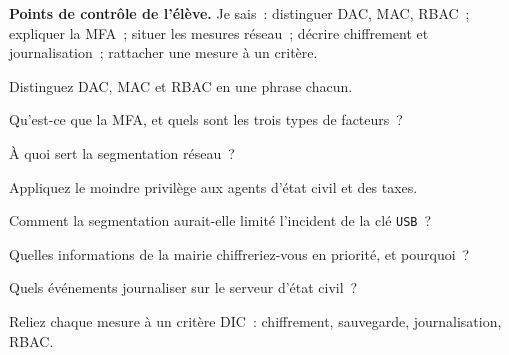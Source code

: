 \begin{boxinfo}
\textbf{Points de contrôle de l'élève.} Je sais~: distinguer DAC, MAC, RBAC~;
expliquer la MFA~; situer les mesures réseau~; décrire chiffrement et
journalisation~; rattacher une mesure à un critère.
\end{boxinfo}

\bigskip

\begin{boxexo}[title={\ding{45}\quad Exercice~16.1. Les modèles \niveaubase}]
Distinguez DAC, MAC et RBAC en une phrase chacun.
\end{boxexo}

\begin{boxexo}[title={\ding{45}\quad Exercice~16.2. MFA \niveaubase}]
Qu'est-ce que la MFA, et quels sont les trois types de facteurs~?
\end{boxexo}

\begin{boxexo}[title={\ding{45}\quad Exercice~16.3. Rôle d'une mesure \niveaubase}]
À quoi sert la segmentation réseau~?
\end{boxexo}

\begin{boxexo}[title={\ding{45}\quad Exercice~16.4. Moindre privilège \niveaumoyen}]
Appliquez le moindre privilège aux agents d'état civil et des taxes.
\end{boxexo}

\begin{boxexo}[title={\ding{45}\quad Exercice~16.5. Segmentation \niveaumoyen}]
Comment la segmentation aurait-elle limité l'incident de la clé \texttt{USB}~?
\end{boxexo}

\begin{boxexo}[title={\ding{45}\quad Exercice~16.6. Chiffrer quoi \niveaumoyen}]
Quelles informations de la mairie chiffreriez-vous en priorité, et pourquoi~?
\end{boxexo}

\begin{boxexo}[title={\ding{45}\quad Exercice~16.7. Journaliser \niveaumoyen}]
Quels événements journaliser sur le serveur d'état civil~?
\end{boxexo}

\begin{boxexo}[title={\ding{45}\quad Exercice~16.8. Mesure et critère \niveaumoyen}]
Reliez chaque mesure à un critère DIC~: chiffrement, sauvegarde,
journalisation, RBAC.
\end{boxexo}

